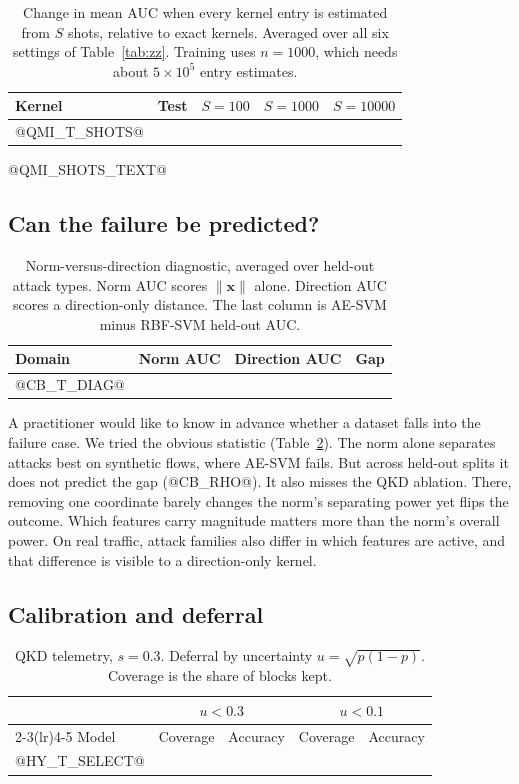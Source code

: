 \documentclass[pdflatex,sn-mathphys-num,lineno]{sn-jnl}
\theoremstyle{thmstyleone}
\begin{document}
\begin{table}[t]
  \centering
  \caption{Change in mean AUC when every kernel entry is estimated from $S$ shots,
  relative to exact kernels. Averaged over all six settings of Table~\ref{tab:zz}. Training uses
  $n=1000$, which needs about $5\times10^5$ entry estimates.}
  \label{tab:shots}
  \small
  \begin{tabular}{llccc}
    \toprule
    Kernel & Test & $S=100$ & $S=1000$ & $S=10000$ \\
    \midrule
@QMI_T_SHOTS@
    \bottomrule
  \end{tabular}
\end{table}

@QMI_SHOTS_TEXT@

\subsection{Can the failure be predicted?}

\begin{table}[t]
  \centering
  \caption{Norm-versus-direction diagnostic, averaged over held-out attack types. Norm
  AUC scores $\|\mathbf{x}\|$ alone. Direction AUC scores a direction-only distance.
  The last column is AE-SVM minus RBF-SVM held-out AUC.}
  \label{tab:diag}
  \small
  \begin{tabular}{lccc}
    \toprule
    Domain & Norm AUC & Direction AUC & Gap \\
    \midrule
@CB_T_DIAG@
    \bottomrule
  \end{tabular}
\end{table}

A practitioner would like to know in advance whether a dataset falls into the
failure case. We tried the obvious statistic (Table~\ref{tab:diag}). The norm alone
separates attacks best on synthetic flows, where AE-SVM fails. But across held-out
splits it does not predict the gap (@CB_RHO@). It also misses the QKD ablation.
There, removing one coordinate barely changes the norm's separating power yet flips
the outcome. Which features carry magnitude matters more than the norm's overall
power. On real traffic, attack families also differ in which features are active,
and that difference is visible to a direction-only kernel.

\subsection{Calibration and deferral}

\begin{table}[t]
  \centering
  \caption{QKD telemetry, $s=0.3$. Deferral by uncertainty $u=\sqrt{p(1-p)}$.
  Coverage is the share of blocks kept.}
  \label{tab:select}
  \small
  \begin{tabular}{lcccc}
    \toprule
    & \multicolumn{2}{c}{$u<0.3$} & \multicolumn{2}{c}{$u<0.1$} \\
    \cmidrule(lr){2-3}\cmidrule(lr){4-5}
    Model & Coverage & Accuracy & Coverage & Accuracy \\
    \midrule
@HY_T_SELECT@
    \bottomrule
  \end{tabular}
\end{table}
\end{document}

